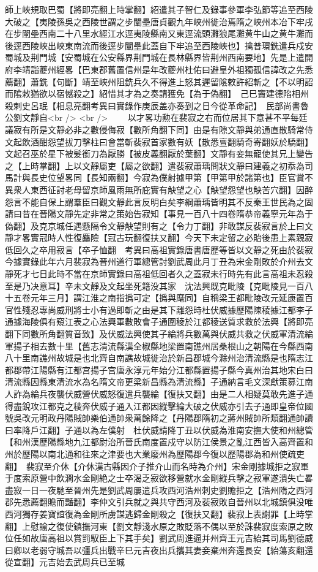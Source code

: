 師上峽規取巴蜀【將即亮翻上時掌翻】紹遣其子智仁及錄事參軍李弘節等追至西陵大破之【夷陵孫吳之西陵世謂之步闡壘唐貞觀九年峽州徙治焉隋之峽州本冶下牢戌在步闡壘西南二十八里水經江水逕夷陵縣南又東逕流頭灘狼尾灘黄牛山之黄牛灘而後逕西陵峽出峽東南流而後逕步闡壘此蓋自下牢追至西陵峽也】擒普環銑遣兵戍安蜀城及荆門城【安蜀城在公安縣界荆門城在長林縣界皆荆州西南要地】先是上遣開府李靖詣夔州經畧【巴東郡舊置信州是年改夔州杜佑曰避皇外祖獨孤信諱改之先悉薦翻】蕭銑【句斷】靖至峽州阻銑兵久不得進上怒其遲留隂敕許紹斬之【不以明詔而隂敕猶欲以宿憾殺之】紹惜其才為之奏請獲免【為于偽翻】　己巳竇建德陷相州殺刺史呂珉【相息亮翻考異曰實錄作庚辰盖亦奏到之日今從革命記】　民部尚書魯公劉文靜自<br />
<br />
　　以才畧功勲在裴寂之右而位居其下意甚不平每廷議寂有所是文靜必非之數侵侮寂【數所角翻下同】由是有隙文靜與弟通直散騎常侍文起飲酒酣怨望拔刀擊柱曰會當斬裴寂首家數有妖【散悉亶翻騎奇寄翻妖於驕翻】文起召巫於星下被髮銜刀為厭勝【被皮義翻厭於葉翻】文靜有妾無寵使其兄上變告之【上時掌翻】上以文靜屬吏【屬之欲翻】遣裴寂蕭瑀問狀文靜曰建義之初忝為司馬計與長史位望畧同【長知兩翻】今寂為僕射據甲第【甲第甲於諸第也】臣官賞不異衆人東西征討老母留京師風雨無所庇實有觖望之心【觖望怨望也觖苦穴翻】因醉怨言不能自保上謂羣臣曰觀文靜此言反明白矣李綱蕭瑀皆明其不反秦王世民為之固請曰昔在晉陽文靜先定非常之策始告寂知【事見一百八十四卷隋恭帝義寧元年為于偽翻】及克京城任遇懸隔令文靜觖望則有之【令力丁翻】非敢謀反裴寂言於上曰文靜才畧實冠時人性復麤險【冠古玩翻復扶又翻】今天下未定留之必貽後患上素親寂低回久之卒用寂言【卒子恤翻　考異曰高祖實錄唐書唐歷等皆以文靜之死由於裴寂今據實錄此年六月裴寂為晉州道行軍總管討劉武周此月丁丑為宋金剛敗於介州去文靜死才七日此時不當在京師實錄曰高祖低回者久之蓋寂未行時先有此言高祖未忍殺至是乃决意耳】辛未文靜及文起坐死籍没其家　沈法興既克毗陵【克毗陵見一百八十五卷元年三月】謂江淮之南指撝可定【撝與麾同】自稱梁王都毗陵改元延康置百官性殘忍專尚威刑將士小有過即斬之由是其下離怨時杜伏威據歷陽陳稜據江都李子通據海陵俱有窺江表之心法興軍數敗會子通圍稜於江都稜送質求救於法興【將即亮翻下同數所角翻質音致】及伏威法興使其子綸將兵數萬與伏威共救之伏威軍清流綸軍揚子相去數十里【舊志清流縣漢全椒縣地梁置南譙州居桑根山之朝陽在今縣西南八十里南譙州故城是也北齊自南譙故城徙治於新昌郡城今滁州治清流縣是也隋志江都郡帶江陽縣有江都宫揚子宫唐永淳元年始分江都縣置揚子縣今真州治其地宋白曰清流縣因縣東清流水為名隋文帝更梁新昌縣為清流縣】子通納言毛文深獻策募江南人詐為綸兵夜襲伏威營伏威怒復遣兵襲綸【復扶又翻】由是二人相疑莫敢先進子通得盡銳攻江都克之稜奔伏威子通入江都因縱擊綸大破之伏威亦引去子通即皇帝位國號吳改元明政丹陽賊帥樂伯通帥衆萬餘降之【丹陽郡隋初之蔣州賊帥所類翻通帥讀曰率降戶江翻】子通以為左僕射　杜伏威請降丁丑以伏威為淮南安撫大使和州總管【和州漢歷陽縣地九江都尉治所晉氏南度置戍守以防江侯景之亂江西皆入高齊置和州於歷陽以南北通和往來之津要也大業廢州為歷陽郡今復以歷陽郡為和州使疏吏翻】　裴寂至介休【介休漢古縣因介子推介山而名時為介州】宋金剛據城拒之寂軍于度索原營中飲澗水金剛絶之士卒渴乏寂欲移營就水金剛縱兵擊之寂軍遂潰失亡畧盡寂一日一夜馳至晉州先是劉武周屢遣兵攻西河浩州刺史劉贍拒之【浩州隋之西河郡先悉薦翻贍而豔翻】李仲文引兵就之與共守西河及裴寂敗自晉州以北城鎮俱没唯西河獨存姜寶誼復為金剛所虜謀逃歸金剛殺之【復扶又翻】裴寂上表謝罪【上時掌翻】上慰諭之復使鎮撫河東【劉文靜淺水原之敗貶落不偶以至於誅裴寂度索原之敗位任如故唐高祖以賞罰馭臣上下其手矣】劉武周進逼并州齊王元吉紿其司馬劉德威曰卿以老弱守城吾以彊兵出戰辛巳元吉夜出兵攜其妻妾棄州奔還長安【紿蕩亥翻還從宣翻】元吉始去武周兵已至城